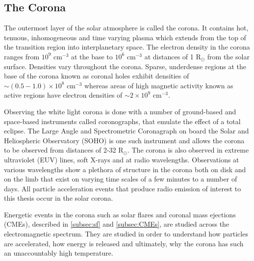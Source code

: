 \subsection{The Corona}
The outermost layer of the solar atmosphere is called the corona. It contains hot, tenuous, inhomogeneous and time varying plasma which extends from the top of the transition region into interplanetary space.
The electron density in the corona ranges from $10^{9} \mbox{ cm}^{-3}$ at the base to $10^{6} \mbox{ cm}^{-3}$ at distances of 1 R$_{\odot}$ from the solar surface. Densities vary throughout the corona. Sparse, underdense regions at the base of the corona known as coronal holes exhibit densities of $\sim ( 0.5 - 1.0) \times 10^8 \mbox{ cm}^{-3}$ whereas areas of high magnetic activity known as active regions have electron densities of $\sim 2 \times 10^9 \mbox{ cm}^{-3}$.%

Observing the white light corona is done with a number of ground-based and space-based instruments called coronographs, that emulate the effect of a total eclipse. The Large Angle and Spectrometric Coronagraph \citep[LASCO;][]{Brueckner1995} on board the Solar and Heliospheric Observatory (SOHO) is one such instrument and allows the corona to be observed from distances of 2-32 R$_\odot$. The corona is also observed in extreme ultraviolet (EUV) lines, soft X-rays and at radio wavelengths. Observations at various wavelengths show a plethora of structure in the corona both on disk and on the limb that exist on varying time scales of a few minutes to a number of days. All particle acceleration events that produce radio emission of interest to this thesis occur in the solar corona.

Energetic events in the corona such as solar flares and coronal mass ejections (CMEs), described in \ref{subsec:sf} and \ref{subsec:CMEs}, are studied across the electromagnetic spectrum. They are studied in order to understand how particles are accelerated, how energy is released and ultimately, why the corona has such an unaccountably high temperature.

